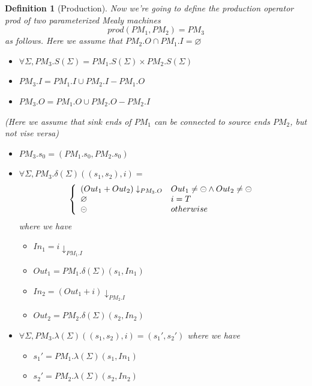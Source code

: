 \documentclass[conference, a4paper]{IEEEtran}
\newtheorem{definition}{Definition}
\newcommand{\rblock}[0]{\circleddash}
\newcommand{\rempty}[0]{\varnothing}
\begin{document}
\begin{definition}[Production]
  Now we're going to define the production operator \emph{prod} of two parameterized Mealy machines
  \[
  prod(PM_1,PM_2)=PM_3
  \]
  as follows. Here we assume that $PM_2.O\cap PM_1.I=\varnothing$
  \begin{itemize}
  	\item[-] $\forall\Sigma, PM_3.S(\Sigma)=PM_1.S(\Sigma)\times PM_2.S(\Sigma)$
    \item[-] $PM_3.I=PM_1.I\cup PM_2.I-PM_1.O$
    \item[-] $PM_3.O=PM_1.O\cup PM_2.O-PM_2.I$
  \end{itemize}
  \emph{(Here we assume that sink ends of $PM_1$ can be connected to source ends $PM_2$, but not
  vise versa)}
  \begin{itemize}
    \item[-] $PM_3.s_0=(PM_1.s_0, PM_2.s_0)$
    \item[-] $\forall\Sigma, PM_3.\delta(\Sigma)((s_1,s_2), i)=$
      \begin{displaymath}
        \left\{
        \begin{array}[ht]{ll}
          (Out_1 + Out_2)\downarrow_{PM_3.O} & Out_1\neq\rblock\land Out_2\neq\rblock \\
          \rempty & i = T \\
          \rblock & otherwise \\
        \end{array}
        \right.
      \end{displaymath}
      where we have
      \begin{itemize}
        \item[*] $In_1 = i\downarrow_{PM_1.I}$
        \item[*] $Out_1 = PM_1.\delta(\Sigma)(s_1,In_1)$
        \item[*] $In_2 = (Out_1 + i)\downarrow_{PM_2.I}$
        \item[*] $Out_2 = PM_2.\delta(\Sigma)(s_2,In_2)$
      \end{itemize}
    \item[-] $\forall\Sigma, PM_3. \lambda(\Sigma)((s_1,s_2),i)=(s_1',s_2')$
      where we have
      \begin{itemize}
        \item[*] $s_1' = PM_1.\lambda(\Sigma)(s_1,In_1)$
        \item[*] $s_2' = PM_2.\lambda(\Sigma)(s_2,In_2)$
      \end{itemize}
  \end{itemize}
\end{definition}
\end{document}
